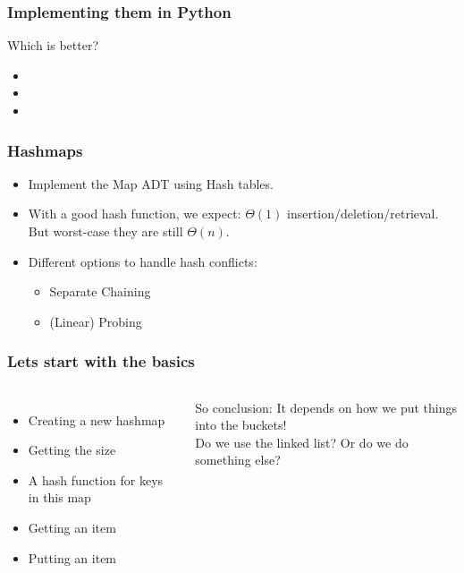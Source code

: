 \begin{frame}
	\frametitle{Implementing them in Python}

	Which is better?	
		

		
			\begin{itemize}
			\item 
			\item 
			\item 
	\end{itemize}
	


		
\end{frame}

\begin{frame}
	\frametitle{Hashmaps}
			\begin{itemize}
			\item Implement the Map ADT using Hash tables.
			\item With a good hash function, we expect: $\Theta(1)$ insertion/deletion/retrieval.
			But worst-case they are still $\Theta(n)$.
			\item Different options to handle hash conflicts:
			\begin{itemize}
				\item Separate Chaining
				\item (Linear) Probing
			\end{itemize}
		\end{itemize}
\end{frame}

\begin{frame}
	\frametitle{Lets start with the basics}
	\begin{columns}[T]
		\begin{itemize}
			\item Creating a new hashmap
			\item Getting the size
			\item A hash function for keys in this map
			\item Getting an item
			\item Putting an item
		\end{itemize}
		So conclusion: It depends on how we put things into the buckets!\\
				Do we use the linked list? Or do we do something else?
		
	\end{columns}
\end{frame}


